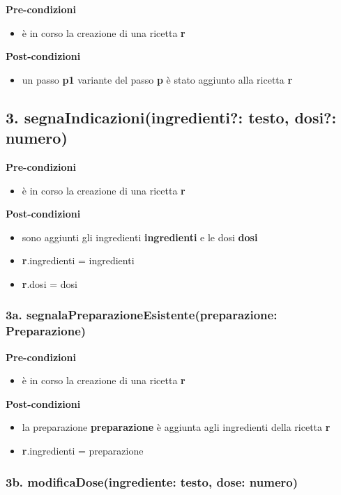 \textbf{Pre-condizioni}
\begin{itemize}
  \item è in corso la creazione di una ricetta  \textbf{r}
\end{itemize}
\textbf{Post-condizioni}
\begin{itemize}
  \item un passo  \textbf{p1} variante del passo  \textbf{p} è stato aggiunto alla ricetta  \textbf{r}
\end{itemize}

\subsection*{3. segnaIndicazioni(ingredienti?: testo, dosi?: numero)}

\textbf{Pre-condizioni}
\begin{itemize}
  \item è in corso la creazione di una ricetta  \textbf{r}
\end{itemize}
\textbf{Post-condizioni}
\begin{itemize}
  \item sono aggiunti gli ingredienti  \textbf{ingredienti} e le dosi  \textbf{dosi}
  \item \textbf{r}.ingredienti = ingredienti
  \item \textbf{r}.dosi = dosi
\end{itemize}

\subsubsection*{3a. segnalaPreparazioneEsistente(preparazione: Preparazione)}

\textbf{Pre-condizioni}
\begin{itemize}
  \item è in corso la creazione di una ricetta  \textbf{r}
\end{itemize}
\textbf{Post-condizioni}
\begin{itemize}
  \item la preparazione  \textbf{preparazione} è aggiunta agli ingredienti della ricetta  \textbf{r}
  \item \textbf{r}.ingredienti = preparazione
\end{itemize}

\subsubsection*{3b. modificaDose(ingrediente: testo, dose: numero)}

